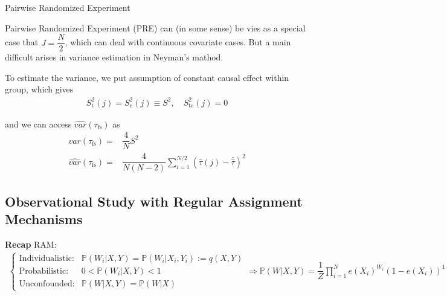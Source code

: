\begin{point}
    Pairwise Randomized Experiment
\end{point}

Pairwise Randomized Experiment (PRE) can (in some sense) be vies as a special case that $ J=\dfrac{N}{2} $, which can deal with continuous covariate cases. But a main difficult arises in variance estimation in Neyman's mathod. 

To estimate the variance, we put assumption of constant causal effect within group, which gives
\begin{align}
     S^2_\mathrm{t}(j)=S^2_\mathrm{c}(j)\equiv S^2,\quad S^2_\mathrm{tc}(j)=0 
\end{align}

and we can access $ \hat{var}(\tau_\mathrm{fs} ) $ as
\begin{align}
    var(\tau_\mathrm{fs} )=&\dfrac{4}{N}S^2\\
    \hat{var}(\tau_\mathrm{fs} )=&\dfrac{4}{N(N-2)}\sum_{i=1}^{N/2}\left(\hat{\tau}(j)-\bar{\hat{\tau}}\right)^2
\end{align}

\subsection{Observational Study with Regular Assignment Mechanisms}
\textbf{Recap} RAM:
\begin{align}
    \begin{cases}
        \text{Individualistic:}&\mathbb{P}\left( W_i|X,Y \right)= \mathbb{P}\left( W_i|X_i,Y_i \right) := q(X,Y)\\
        \text{Probabilistic:}&0<\mathbb{P}\left( W_i|X,Y \right)<1\\
        \text{Unconfounded:}&\mathbb{P}\left( W|X,Y \right)=\mathbb{P}\left( W|X \right)  
    \end{cases} \Rightarrow \mathbb{P}\left( W|X,Y \right)=\dfrac{1}{Z}\prod_{i=1}^N e(X_i)^{W_i}(1-e(X_i))^{1-W_i} 
\end{align}

    
